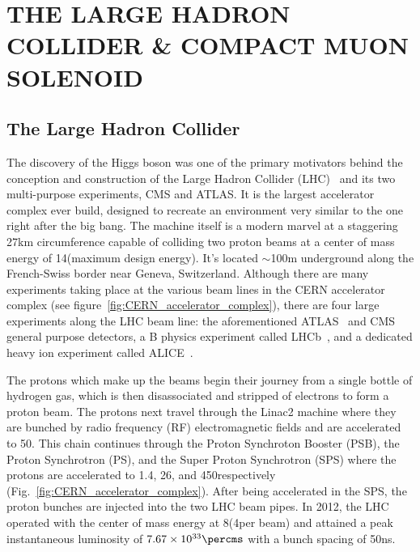 %
%
%



\chapter{\uppercase {The Large Hadron Collider \& Compact Muon Solenoid}}

\section{The Large Hadron Collider}

The discovery of the Higgs boson was one of the primary motivators behind the conception and construction of the Large Hadron Collider (LHC)~\cite{Pettersson:291782} and its two multi-purpose experiments, CMS and ATLAS.
It is the largest accelerator complex ever build, designed to recreate an environment very similar to the one right after the big bang.
The machine itself is a modern marvel at a staggering 27\unit{km} circumference capable of colliding two proton beams at a center of mass energy of 14\tev (maximum design energy).
It's located $\sim$100\unit{m} underground along the French-Swiss border near Geneva, Switzerland.
Although there are many experiments taking place at the various beam lines in the CERN accelerator complex (see figure~\ref{fig:CERN_accelerator_complex}), there are four large experiments along the LHC beam line: the aforementioned ATLAS~\cite{1748-0221-3-08-S08003} and CMS~\cite{Chatrchyan:2008aa} general purpose detectors, a B physics experiment called LHCb~\cite{Alves:2008zz}, and a dedicated heavy ion experiment called ALICE~\cite{Aamodt:2008zz}.

The protons which make up the beams begin their journey from a single bottle of hydrogen gas, which is then disassociated and stripped of electrons to form a proton beam.
The protons next travel through the Linac2 machine where they are bunched by radio frequency (RF) electromagnetic fields and are accelerated to 50\MeV.
This chain continues through the Proton Synchroton Booster (PSB), the Proton Synchrotron (PS), and the Super Proton Synchrotron (SPS) where the protons are accelerated to 1.4\GeV, 26\GeV, and 450\GeV respectively (Fig.~\ref{fig:CERN_accelerator_complex}).
After being accelerated in the SPS, the proton bunches are injected into the two LHC beam pipes.
In 2012, the LHC operated with the center of mass energy at 8\TeV (4\TeV per beam) and attained a peak instantaneous luminosity of $7.67\times10^{33}\percms$ with a bunch spacing of 50\unit{ns}.


